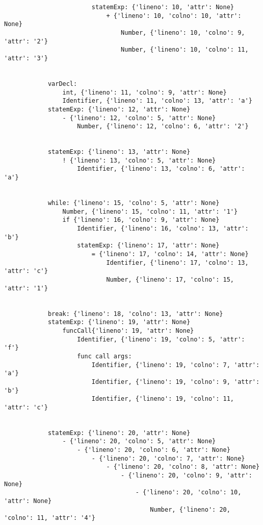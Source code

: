 \documentclass{article}
\begin{document}
\begin{itemize}
\begin{verbatim}
                        statemExp: {'lineno': 10, 'attr': None}
                            + {'lineno': 10, 'colno': 10, 'attr': None}
                                Number, {'lineno': 10, 'colno': 9, 'attr': '2'}
                                Number, {'lineno': 10, 'colno': 11, 'attr': '3'}


            varDecl:
                int, {'lineno': 11, 'colno': 9, 'attr': None}
                Identifier, {'lineno': 11, 'colno': 13, 'attr': 'a'}
            statemExp: {'lineno': 12, 'attr': None}
                - {'lineno': 12, 'colno': 5, 'attr': None}
                    Number, {'lineno': 12, 'colno': 6, 'attr': '2'}


            statemExp: {'lineno': 13, 'attr': None}
                ! {'lineno': 13, 'colno': 5, 'attr': None}
                    Identifier, {'lineno': 13, 'colno': 6, 'attr': 'a'}


            while: {'lineno': 15, 'colno': 5, 'attr': None}
                Number, {'lineno': 15, 'colno': 11, 'attr': '1'}
                if {'lineno': 16, 'colno': 9, 'attr': None}
                    Identifier, {'lineno': 16, 'colno': 13, 'attr': 'b'}
                    statemExp: {'lineno': 17, 'attr': None}
                        = {'lineno': 17, 'colno': 14, 'attr': None}
                            Identifier, {'lineno': 17, 'colno': 13, 'attr': 'c'}
                            Number, {'lineno': 17, 'colno': 15, 'attr': '1'}


            break: {'lineno': 18, 'colno': 13, 'attr': None}
            statemExp: {'lineno': 19, 'attr': None}
                funcCall{'lineno': 19, 'attr': None}
                    Identifier, {'lineno': 19, 'colno': 5, 'attr': 'f'}
                    func call args:
                        Identifier, {'lineno': 19, 'colno': 7, 'attr': 'a'}
                        Identifier, {'lineno': 19, 'colno': 9, 'attr': 'b'}
                        Identifier, {'lineno': 19, 'colno': 11, 'attr': 'c'}


            statemExp: {'lineno': 20, 'attr': None}
                - {'lineno': 20, 'colno': 5, 'attr': None}
                    - {'lineno': 20, 'colno': 6, 'attr': None}
                        - {'lineno': 20, 'colno': 7, 'attr': None}
                            - {'lineno': 20, 'colno': 8, 'attr': None}
                                - {'lineno': 20, 'colno': 9, 'attr': None}
                                    - {'lineno': 20, 'colno': 10, 'attr': None}
                                        Number, {'lineno': 20, 'colno': 11, 'attr': '4'}








\end{verbatim}
\end{itemize}
\end{document}
